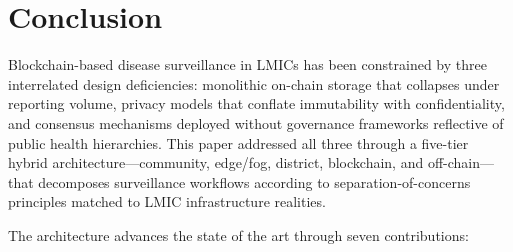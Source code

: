 \documentclass[AMA,LATO1COL]{WileyNJDv5}
\begin{document}
\section{Conclusion}\label{sec:conclusion}

Blockchain-based disease surveillance in LMICs has been constrained by three interrelated design deficiencies: monolithic on-chain storage that collapses under reporting volume, privacy models that conflate immutability with confidentiality, and consensus mechanisms deployed without governance frameworks reflective of public health hierarchies. This paper addressed all three through a five-tier hybrid architecture---community, edge/fog, district, blockchain, and off-chain---that decomposes surveillance workflows according to separation-of-concerns principles matched to LMIC infrastructure realities.

The architecture advances the state of the art through seven contributions:
\end{document}
